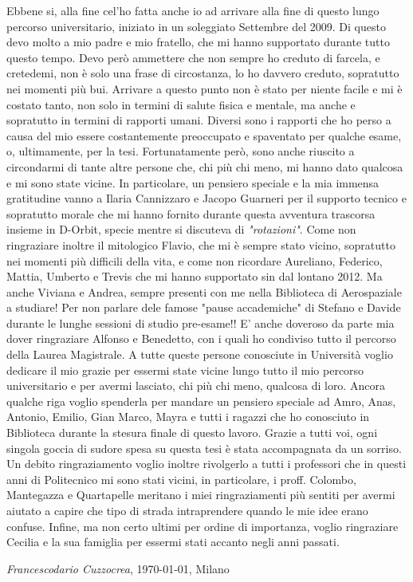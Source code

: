 Ebbene si, alla fine cel'ho fatta anche io ad arrivare alla fine di questo lungo percorso universitario, iniziato in un soleggiato Settembre del 2009. Di questo devo molto a mio padre e mio fratello, che mi hanno supportato durante tutto questo tempo. Devo però ammettere che non sempre ho creduto di farcela, e cretedemi, non è solo una frase di circostanza, lo ho davvero creduto, sopratutto nei momenti più bui. Arrivare a questo punto non è stato per niente facile e mi è costato tanto, non solo in termini di salute fisica e mentale, ma anche e sopratutto in termini di rapporti umani. Diversi sono i rapporti che ho perso a causa del mio essere costantemente preoccupato e spaventato per qualche esame, o, ultimamente, per la tesi. Fortunatamente però, sono anche riuscito a circondarmi di tante altre persone che, chi più chi meno, mi hanno dato qualcosa e mi sono state vicine. In particolare, un pensiero speciale e la mia immensa gratitudine vanno a Ilaria Cannizzaro e Jacopo Guarneri per il supporto tecnico e sopratutto morale che mi hanno fornito durante questa avventura trascorsa insieme in D-Orbit, specie mentre si discuteva di \textit{"rotazioni"}. Come non ringraziare inoltre il mitologico Flavio, che mi è sempre stato vicino, sopratutto nei momenti più difficili della vita, e come non ricordare Aureliano, Federico, Mattia, Umberto e Trevis che mi hanno supportato sin dal lontano 2012. Ma anche Viviana e Andrea, sempre presenti con me nella Biblioteca di Aerospaziale a studiare! Per non parlare dele famose "pause accademiche" di Stefano e Davide durante le lunghe sessioni di studio pre-esame!! E' anche doveroso da parte mia dover ringraziare Alfonso e Benedetto, con i quali ho condiviso tutto il percorso della Laurea Magistrale. A tutte queste persone conosciute in Università voglio dedicare il mio grazie per essermi state vicine lungo tutto il mio percorso universitario e per avermi lasciato, chi più chi meno, qualcosa di loro. Ancora qualche riga voglio spenderla per mandare un pensiero speciale ad Amro, Anas, Antonio, Emilio, Gian Marco, Mayra e tutti i ragazzi che ho conosciuto in Biblioteca durante la stesura finale di questo lavoro. Grazie a tutti voi, ogni singola goccia di sudore spesa su questa tesi è stata accompagnata da un sorriso. Un debito ringraziamento voglio inoltre rivolgerlo a tutti i professori che in questi anni di Politecnico mi sono stati vicini, in particolare, i proff. Colombo, Mantegazza e Quartapelle meritano i miei ringraziamenti più sentiti per avermi aiutato a capire che tipo di strada intraprendere quando le mie idee erano confuse.
\newpage
Infine, ma non certo ultimi per ordine di importanza, voglio ringraziare Cecilia e la sua famiglia per essermi stati accanto negli anni passati.

\vspace{\baselineskip}

\textit{Francescodario Cuzzocrea}, \today, Milano